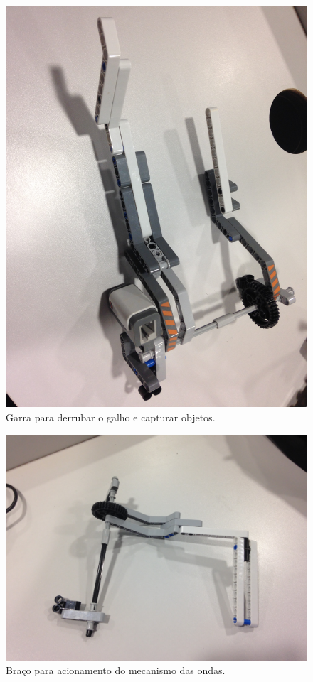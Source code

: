 \documentclass{article}
\begin{document}
	\begin{figure}[h!]
		\includegraphics[width=\linewidth]{../Images/claw_2.JPG}
		\caption{Garra para derrubar o galho e capturar objetos.}
		\label{fig:claw_2}
	\end{figure}

	\begin{figure}[h!]
		\includegraphics[width=\linewidth]{../Images/claw_3.JPG}
		\caption{Braço para acionamento do mecanismo das ondas.}
		\label{fig:claw_3}
	\end{figure}
\end{document}
